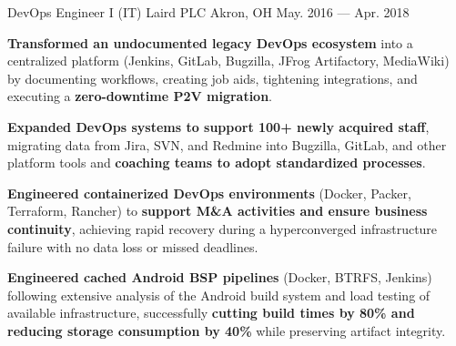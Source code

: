\begin{cventries}
    \cventry
        { DevOps Engineer I (IT) }
        { Laird PLC }
        { Akron, OH }
        { May. 2016 --- Apr. 2018 }
        {
            \begin{cvitems}
                \item{\textbf{Transformed an undocumented legacy DevOps ecosystem} into a centralized platform (Jenkins, GitLab, Bugzilla, JFrog Artifactory, MediaWiki) by documenting workflows, creating job aids, tightening integrations, and executing a \textbf{zero-downtime P2V migration}.}
                \item{\textbf{Expanded DevOps systems to support 100+ newly acquired staff}, migrating data from Jira, SVN, and Redmine into Bugzilla, GitLab, and other platform tools and \textbf{coaching teams to adopt standardized processes}.}
                \item{\textbf{Engineered containerized DevOps environments} (Docker, Packer, Terraform, Rancher) to \textbf{support M\&A activities and ensure business continuity}, achieving rapid recovery during a hyperconverged infrastructure failure with no data loss or missed deadlines.}
                \item{\textbf{Engineered cached Android BSP pipelines} (Docker, BTRFS, Jenkins) following extensive analysis of the Android build system and load testing of available infrastructure, successfully \textbf{cutting build times by 80\% and reducing storage consumption by 40\%} while preserving artifact integrity.}
            \end{cvitems}
        }
\end{cventries}
